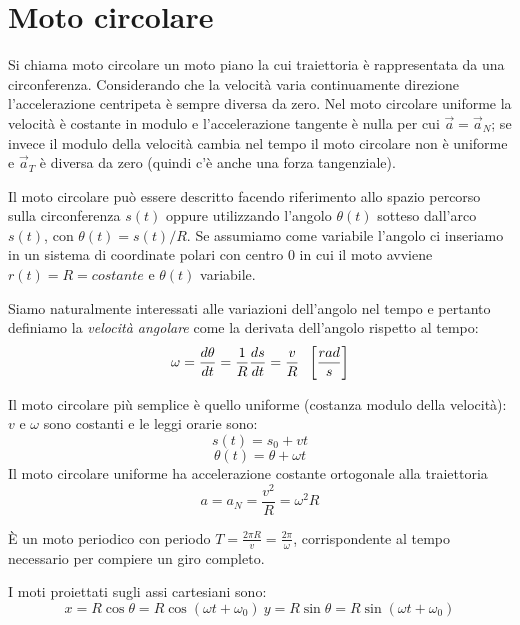 \documentclass[class=book, crop=false, oneside, 12pt]{standalone}
\begin{document}
\section{Moto circolare}

Si chiama moto circolare un moto piano la cui traiettoria è rappresentata da una circonferenza. Considerando che la velocità varia continuamente direzione l'accelerazione centripeta è sempre diversa da zero.
Nel moto circolare uniforme la velocità è costante in modulo e l'accelerazione tangente è nulla per cui \(\overrightarrow{a} = \overrightarrow{a}_N\);
se invece il modulo della velocità cambia nel tempo il moto circolare non è uniforme e \(\overrightarrow{a}_T\) è diversa da zero (quindi c'è anche una forza tangenziale).

Il moto circolare può essere descritto facendo riferimento allo spazio percorso sulla circonferenza \(s(t)\) oppure
utilizzando l'angolo \(\theta (t)\) sotteso dall'arco \(s(t)\), con \(\theta(t) = s(t)/R\).
Se assumiamo come variabile l'angolo ci inseriamo in un sistema di coordinate polari con centro \(0\) in cui il moto avviene \(r(t) = R = costante\) e \(\theta(t)\) variabile.

Siamo naturalmente interessati alle variazioni dell'angolo nel tempo e pertanto definiamo la \emph{velocità angolare} come la derivata dell'angolo rispetto al tempo:
\begin{equation}
  \omega = \frac{d \theta}{dt} = \frac{1}{R} \frac {ds} {dt} = \frac{v}{R} \hspace{0.2cm} \left[\frac{rad}{s}\right]
\end{equation}

Il moto circolare più semplice è quello uniforme (costanza modulo della velocità): \(v\) e \(\omega\) sono costanti e le leggi orarie sono:
\begin{equation}
  s(t) = s_0 + vt
\end{equation}
\begin{equation}
  \theta(t) = \theta + \omega t
\end{equation}
Il moto circolare uniforme ha accelerazione costante ortogonale alla traiettoria
\begin{equation}
  a = a_N = \frac{v^2}{R} = \omega^2 R
\end{equation}

È un moto periodico con periodo \(T = \frac{2 \pi R}{v} = \frac{2 \pi}{\omega}\), corrispondente al tempo necessario per compiere un giro completo.

I moti proiettati sugli assi cartesiani sono:
\begin{equation}
  x = R \cos \theta = R \cos (\omega t + \omega_0) \
  y = R \sin \theta = R \sin (\omega t + \omega_0)
\end{equation}
\end{document}
